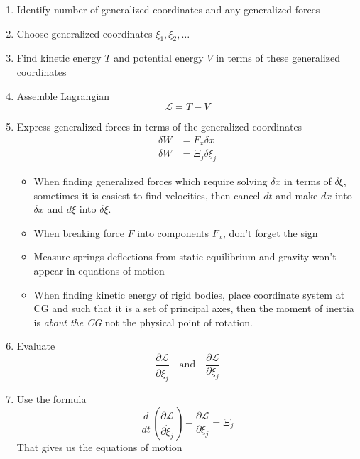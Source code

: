 \documentclass[letterpaper,twocolumn,notitlepage]{article}
\begin{document}
  \begin{enumerate}
    \item{Identify number of generalized coordinates and any generalized forces}
    \item{Choose generalized coordinates $\xi_{1},\xi_{2},\dots$}
    \item{Find kinetic energy $T$ and potential energy $V$ in terms of these generalized coordinates}
    \item{Assemble Lagrangian}
    \begin{equation*}
      \boxed{\mathscr{L}=T-V}
    \end{equation*}
    \item{Express generalized forces in terms of the generalized coordinates}
    \begin{equation*}
      \begin{split}
        \delta W&=F_{x}\delta x \\
        \delta W&=\Xi_{j}\delta\xi_{j}
      \end{split}
    \end{equation*}
    \begin{itemize}
      \item{When finding generalized forces which require solving $\delta x$ in terms of $\delta\xi$, sometimes it is easiest to find velocities, then cancel $dt$ and make $dx$ into $\delta x$ and $d\xi$ into $\delta\xi$.}
      \item{When breaking force $F$ into components $F_{x}$, don't forget the sign}
      \item{Measure springs deflections from static equilibrium and gravity won't appear in equations of motion}
      \item{When finding kinetic energy of rigid bodies, place coordinate system at CG and such that it is a set of principal axes, then the moment of inertia is \textit{about the CG} not the physical point of rotation.}
    \end{itemize}
    \item{Evaluate}
    \begin{equation*}
      \frac{\partial\mathscr{L}}{\partial\dot{\xi}_{j}}
      \quad
      \text{and}
      \quad
      \frac{\partial\mathscr{L}}{\partial\xi_{j}}
    \end{equation*}
    \item{Use the formula}
    \begin{equation*}
      \boxed{\frac{d}{dt}\left(\frac{\partial\mathscr{L}}{\partial\dot{\xi}_{j}}\right)-\frac{\partial\mathscr{L}}{\partial\xi_{j}}=\Xi_{j}}
    \end{equation*}
    That gives us the equations of motion
  \end{enumerate}
\end{document}
